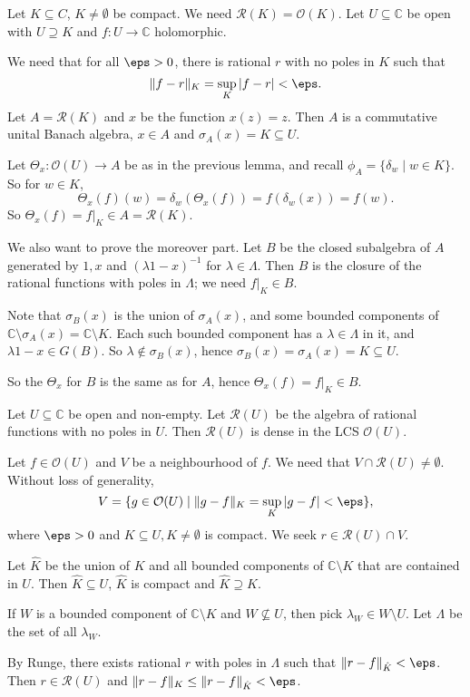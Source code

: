 \documentclass[12pt]{article}
\begin{document}
\begin{proofbox}
	Let $K \subseteq C$, $K \neq \emptyset$ be compact. We need $\mathcal{R}(K) = \mathcal{O}(K)$. Let $U \subseteq \mathbb{C}$ be open with $U \supseteq K$ and $f : U \to \mathbb{C}$ holomorphic.

	We need that for all $\eps > 0$, there is rational $r$ with no poles in $K$ such that
	\[
	\|f - r\|_K = \sup_K |f - r | < \eps.
	\]
	Let $A = \mathcal{R}(K)$ and $x$ be the function $x(z) = z$. Then $A$ is a commutative unital Banach algebra, $x \in A$ and $\sigma_A(x) = K \subseteq U$.

	Let $\Theta_x : \mathcal{O}(U) \to A$ be as in the previous lemma, and recall $\phi_A = \{\delta_w \mid w \in K\}$. So for $w \in K$,
	\[
	\Theta_x(f)(w) = \delta_w(\Theta_x(f)) = f(\delta_w(x)) = f(w).
	\]
	So $\Theta_x(f) = f|_K \in A = \mathcal{R}(K)$.

	We also want to prove the moreover part. Let $B$ be the closed subalgebra of $A$ generated by $1, x$ and $(\lambda1 - x)^{-1}$ for $\lambda \in \Lambda$. Then $B$ is the closure of the rational functions with poles in $\Lambda$; we need $f|_K \in B$.

	Note that $\sigma_B(x)$ is the union of $\sigma_A(x)$, and some bounded components of $\mathbb{C} \setminus \sigma_A(x) = \mathbb{C} \setminus K$. Each such bounded component has a $\lambda \in \Lambda$ in it, and $\lambda 1 - x \in G(B)$. So $\lambda \not \in \sigma_B(x)$, hence $\sigma_B(x) = \sigma_A(x) = K \subseteq U$.

	So the $\Theta_x$ for $B$ is the same as for $A$, hence $\Theta_x(f) = f|_K \in B$.
\end{proofbox}

\begin{corollary}
	Let $U \subseteq \mathbb{C}$ be open and non-empty. Let $\mathcal{R}(U)$ be the algebra of rational functions with no poles in $U$. Then $\mathcal{R}(U)$ is dense in the LCS $\mathcal{O}(U)$.
\end{corollary}

\begin{proofbox}
	Let $f \in \mathcal{O}(U)$ and $V$ be a neighbourhood of $f$. We need that $V \cap \mathcal{R}(U) \neq \emptyset$. Without loss of generality,
	\[
		V = \{g \in \mathcal{O}(U) \mid \|g - f\|_K = \sup_K |g - f | < \eps\},
	\]
	where $\eps > 0$ and $K \subseteq U, K \neq \emptyset$ is compact. We seek $r \in \mathcal{R}(U) \cap V$.

	Let $\hat K$ be the union of $K$ and all bounded components of $\mathbb{C} \setminus K$ that are contained in $U$. Then $\hat K \subseteq U$, $\hat K$ is compact and $\hat K \supseteq K$.

	If $W$ is a bounded component of $\mathbb{C} \setminus K$ and $W \not \subseteq U$, then pick $\lambda_W \in W \setminus U$. Let $\Lambda$ be the set of all $\lambda_W$.

	By Runge, there exists rational $r$ with poles in $\Lambda$ such that $\|r - f\|_{\hat K} < \eps$. Then $r \in \mathcal{R}(U)$ and $\|r - f\|_K \leq \|r - f\|_{\hat K} < \eps$.
\end{proofbox}
\end{document}
